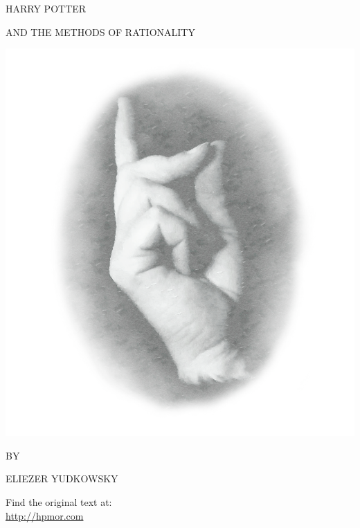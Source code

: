\begin{center}
\thispagestyle{empty}
{\hp
\Huge\MakeUppercase{Harry Potter}\vspace*{0.5cm}

\Large\MakeUppercase{and the Methods of Rationality} %
 
\includegraphics[scale=0.5]{bubble0.png} 

\Large BY \vspace*{.25cm}

\huge ELIEZER YUDKOWSKY%

\normalsize
}

\vspace{3cm}
Find the original text at:\\
\url{http://hpmor.com} \\

\end{center}
\clearpage

